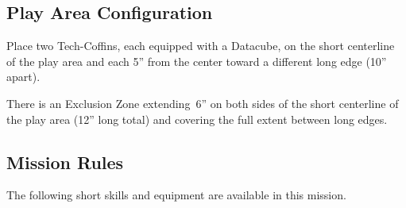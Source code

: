 \label{mission:smashandgrab}

\subsection{Play Area Configuration}

Place two Tech-Coffins, each equipped with a Datacube, on the short
centerline of the play area and each 5'' from the center toward a
different long edge (10'' apart).

  There is an Exclusion Zone
extending~6'' on both sides of the short centerline of the play area
(12'' long total) and covering the full extent between long edges.

\subsection{Mission Rules}

The following short skills and equipment are available in this mission.

